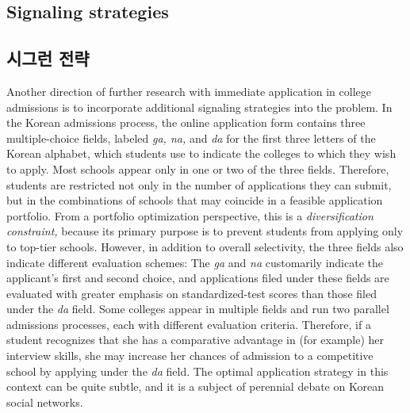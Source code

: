 \documentclass[11pt]{article} %
\theoremstyle{definition}
\theoremstyle{definition}
\begin{document}
\ifen \subsection{Signaling strategies}\else \subsection{시그런 전략}\fi
\ifen
Another direction of further research with immediate application in college admissions is to incorporate additional signaling strategies into the problem. In the Korean admissions process, the online application form contains three multiple-choice fields, labeled \emph{ga, na,} and \emph{da} for the first three letters of the Korean alphabet, which students use to indicate the colleges to which they wish to apply. Most schools appear only in one or two of the three fields. Therefore, students are restricted not only in the number of applications they can submit, but in the combinations of schools that may coincide in a feasible application portfolio. From a portfolio optimization perspective, this is a \emph{diversification constraint,} because its primary purpose is to prevent students from applying only to top-tier schools. However, in addition to overall selectivity, the three fields also indicate different evaluation schemes: The \emph{ga} and \emph{na} customarily indicate the applicant's first and second choice, and applications filed under these fields are evaluated with greater emphasis on standardized-test scores than those filed under the \emph{da} field. Some colleges appear in multiple fields and run two parallel admissions processes, each with different evaluation criteria. Therefore, if a student recognizes that she has a comparative advantage in (for example) her interview skills, she may increase her chances of admission to a competitive school by applying under the \emph{da} field. The optimal application strategy in this context can be quite subtle, and it is a subject of perennial debate on Korean social networks.
\end{document}
